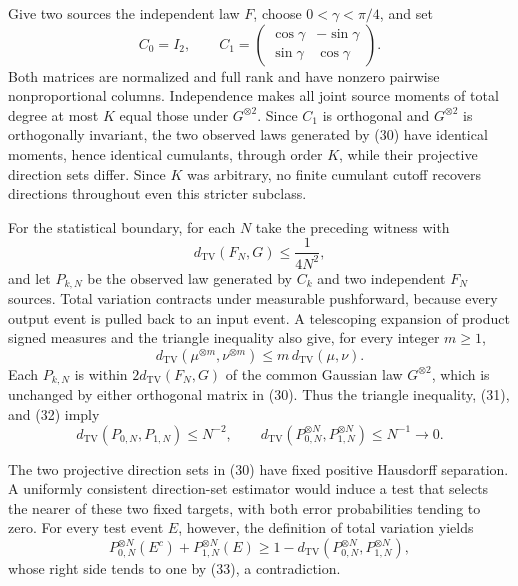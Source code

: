 Give two sources the independent law \(F\), choose \(0<\gamma<\pi/4\), and set
\[
 C_0=I_2,
 \qquad
 C_1=
 \begin{pmatrix}
 \cos\gamma&-\sin\gamma\\
 \sin\gamma&\cos\gamma
 \end{pmatrix}. \tag{30}
\]
Both matrices are normalized and full rank and have nonzero pairwise nonproportional columns. Independence makes all joint source moments of total degree at most \(K\) equal those under \(G^{\otimes2}\). Since \(C_1\) is orthogonal and \(G^{\otimes2}\) is orthogonally invariant, the two observed laws generated by (30) have identical moments, hence identical cumulants, through order \(K\), while their projective direction sets differ. Since \(K\) was arbitrary, no finite cumulant cutoff recovers directions throughout even this stricter subclass.

For the statistical boundary, for each \(N\) take the preceding witness with
\[
 d_{\mathrm{TV}}(F_N,G)\le\frac{1}{4N^2}, \tag{31}
\]
and let \(P_{k,N}\) be the observed law generated by \(C_k\) and two independent \(F_N\) sources. Total variation contracts under measurable pushforward, because every output event is pulled back to an input event. A telescoping expansion of product signed measures and the triangle inequality also give, for every integer \(m\ge1\),
\[
 d_{\mathrm{TV}}(\mu^{\otimes m},\nu^{\otimes m})
 \le m\,d_{\mathrm{TV}}(\mu,\nu). \tag{32}
\]
Each \(P_{k,N}\) is within \(2d_{\mathrm{TV}}(F_N,G)\) of the common Gaussian law \(G^{\otimes2}\), which is unchanged by either orthogonal matrix in (30). Thus the triangle inequality, (31), and (32) imply
\[
 d_{\mathrm{TV}}(P_{0,N},P_{1,N})\le N^{-2},
 \qquad
 d_{\mathrm{TV}}(P_{0,N}^{\otimes N},P_{1,N}^{\otimes N})\le N^{-1}\longrightarrow0. \tag{33}
\]

The two projective direction sets in (30) have fixed positive Hausdorff separation. A uniformly consistent direction-set estimator would induce a test that selects the nearer of these two fixed targets, with both error probabilities tending to zero. For every test event \(E\), however, the definition of total variation yields
\[
 P_{0,N}^{\otimes N}(E^c)+P_{1,N}^{\otimes N}(E)
 \ge1-d_{\mathrm{TV}}(P_{0,N}^{\otimes N},P_{1,N}^{\otimes N}), \tag{34}
\]
whose right side tends to one by (33), a contradiction.

